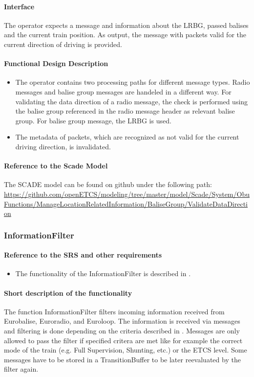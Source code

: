 \paragraph{Interface}
The operator expects a message and information about the LRBG, passed balises and the current train position. As output, the message with packets valid for the current direction of driving is provided.

\paragraph{Functional Design Description}
\begin{itemize}
 \item The operator contains two processing paths for different message types. Radio messages and balise group messages are handeled in a different way. For validating the data direction of a radio message, the check is performed using the balise group referenced in the radio message header as relevant balise group. For balise group message, the LRBG is used.
 \item The metadata of packets, which are recognized as not valid for the current driving direction, is invalidated.
\end{itemize}

\paragraph{Reference to the Scade Model}
The SCADE model can be found on github under the following path: \url{https://github.com/openETCS/modeling/tree/master/model/Scade/System/ObuFunctions/ManageLocationRelatedInformation/BaliseGroup/ValidateDataDirection}

\subsubsection{InformationFilter}

\paragraph{Reference to the SRS and other requirements}
\begin{itemize}
 \item The functionality of the InformationFilter is described in \cite[Chapter~4.8]{subset-026}.
\end{itemize}

\paragraph{Short description of the functionality}
The function InformationFilter filters incoming information received
from Eurobalise, Euroradio, and Euroloop. The information is received
via messages and filtering is done depending on the criteria described
in \cite[Chapter~4.8]{subset-026}. Messages are only allowed to pass
the filter if specified critera are met like for example the correct
mode of the train (e.g. Full Supervision, Shunting, etc.) or the ETCS
level. Some messages have to be stored in a TransitionBuffer to be
later reevaluated by the filter again.

